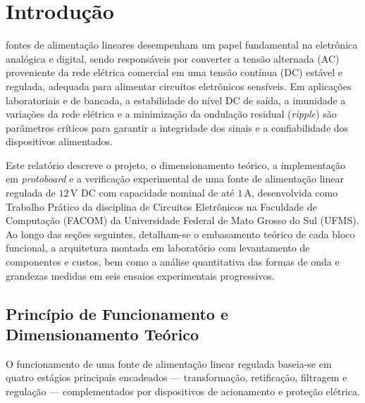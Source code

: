 \section{Introdução}

 fontes de alimentação lineares desempenham um papel fundamental na eletrônica analógica e digital, sendo responsáveis por converter a tensão alternada (AC) proveniente da rede elétrica comercial em uma tensão contínua (DC) estável e regulada, adequada para alimentar circuitos eletrônicos sensíveis. Em aplicações laboratoriais e de bancada, a estabilidade do nível DC de saída, a imunidade a variações da rede elétrica e a minimização da ondulação residual (\textit{ripple}) são parâmetros críticos para garantir a integridade dos sinais e a confiabilidade dos dispositivos alimentados.

Este relatório descreve o projeto, o dimensionamento teórico, a implementação em \textit{protoboard} e a verificação experimental de uma fonte de alimentação linear regulada de $12\,\text{V}$ DC com capacidade nominal de até $1\,\text{A}$, desenvolvida como Trabalho Prático da disciplina de Circuitos Eletrônicos na Faculdade de Computação (FACOM) da Universidade Federal de Mato Grosso do Sul (UFMS). Ao longo das seções seguintes, detalham-se o embasamento teórico de cada bloco funcional, a arquitetura montada em laboratório com levantamento de componentes e custos, bem como a análise quantitativa das formas de onda e grandezas medidas em seis ensaios experimentais progressivos.

\subsection{Princípio de Funcionamento e Dimensionamento Teórico}

O funcionamento de uma fonte de alimentação linear regulada baseia-se em quatro estágios principais encadeados --- transformação, retificação, filtragem e regulação --- complementados por dispositivos de acionamento e proteção elétrica.

